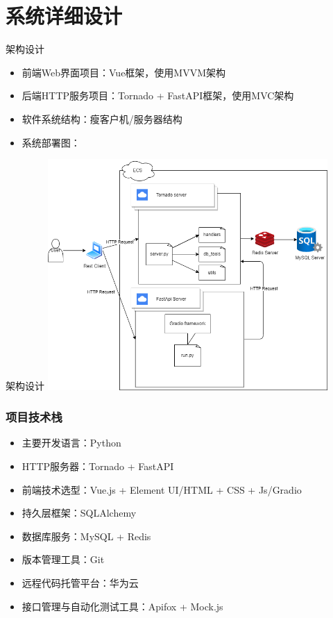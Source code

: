 \section{系统详细设计}
\begin{frame}{架构设计}
    \begin{itemize}
        \item 前端Web界面项目：Vue框架，使用MVVM架构
        \item 后端HTTP服务项目：Tornado + FastAPI框架，使用MVC架构
        \item 软件系统结构：瘦客户机/服务器结构
        \item 系统部署图：
    \end{itemize}
\end{frame}

\begin{frame}{架构设计}
    \includegraphics[width=0.8\textwidth]{contents/figure/system_structure.png}
\end{frame}

\begin{frame}
    \frametitle{项目技术栈}
    \begin{itemize}
        \item 主要开发语言：Python
        \item HTTP服务器：Tornado + FastAPI
        \item 前端技术选型：Vue.js + Element UI/HTML + CSS + Js/Gradio
        \item 持久层框架：SQLAlchemy
        \item 数据库服务：MySQL + Redis
        \item 版本管理工具：Git
        \item 远程代码托管平台：华为云
        \item 接口管理与自动化测试工具：Apifox + Mock.js
    \end{itemize}
\end{frame}

